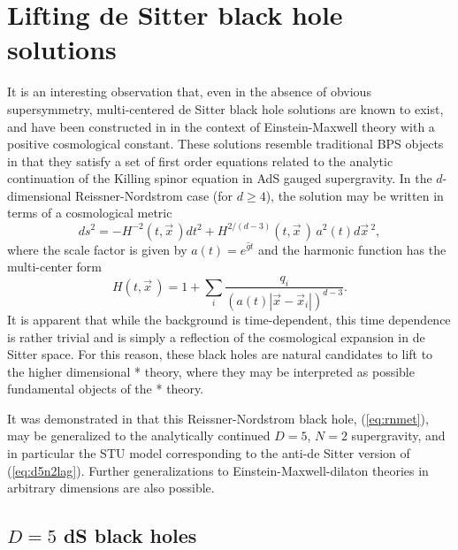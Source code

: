\documentclass[a4paper,12pt]{article}
\newcommand{\fft}[2]{{\frac{#1}{#2}}}
\begin{document}
\section{Lifting de Sitter black hole solutions}

It is an interesting observation that, even in the absence of obvious
supersymmetry, multi-centered de Sitter black hole solutions are known to
exist, and have been constructed in \cite{Kastor:1992nn,London} in the
context of Einstein-Maxwell theory with a positive cosmological constant.
These solutions resemble traditional BPS objects in that they satisfy a
set of first order equations \cite{London,Liu,Behrndt} related to the
analytic continuation of the Killing spinor equation in AdS gauged
supergravity.  In the $d$-dimensional Reissner-Nordstrom case (for $d\ge4$),
the solution may be written in terms of a cosmological metric
%
\begin{equation}
ds^2=-H^{-2}(t,\vec x\,)dt^2+H^{2/(d-3)}(t,\vec x\,)\,a^2(t)d\vec x\,^2,
\label{eq:rnmet}
\end{equation}
%
where the scale factor is given by $a(t)=e^{\hat gt}$ and the harmonic
function has the multi-center form
%
\begin{equation}
H(t,\vec x\,)=1+\sum_i\fft{q_i}{(a(t)|\vec x-\vec x_i|)^{d-3}}.
\end{equation}
%
It is apparent that while the background is time-dependent, this time
dependence is rather trivial and is simply a reflection of the cosmological
expansion in de Sitter space.  For this reason, these black holes are
natural candidates to lift to the higher dimensional * theory, where they
may be interpreted as possible fundamental objects of the * theory.

It was demonstrated in \cite{Liu} that this Reissner-Nordstrom black hole,
(\ref{eq:rnmet}), may be generalized to the analytically continued $D=5$,
$N=2$ supergravity, and in particular the STU model corresponding to the
anti-de Sitter version of (\ref{eq:d5n2lag}).  Further generalizations 
to Einstein-Maxwell-dilaton theories in arbitrary dimensions are also
possible.

\subsection{$D=5$ dS black holes}
\end{document}
